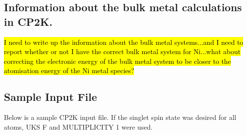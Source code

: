 \documentclass[12pt]{article}
\begin{document}
\newpage
\subsection{Information about the bulk metal calculations in CP2K.}
\hl{I need to write up the information about the bulk metal systems...and I need to report whether or not I have the correct bulk metal system for Ni...what about correcting the electronic energy of the bulk metal system to be closer to the atomisation energy of the Ni metal species?}

\newpage
\subsection{Sample Input File}
Below is a sample CP2K input file. If the singlet spin state was desired for all  atoms, UKS F and MULTIPLICITY 1 were used. 
\end{document}
